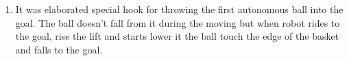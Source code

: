 \begin{enumerate}
\begin{enumerate}
		\item It was elaborated special hook for throwing the first autonomous ball into the goal. The ball doesn't fall from it during the moving but when robot rides to the goal, rise the lift and starts lower it the ball touch the edge of the basket and falls to the goal.
        \begin{figure}[H]
	  	  \begin{minipage}[h]{0.22\linewidth}
	  	  \end{minipage}
	  	  \hfill
	  	  \begin{minipage}[h]{0.26\linewidth}

\end{minipage}
\end{figure}
\end{enumerate}
\end{enumerate}
